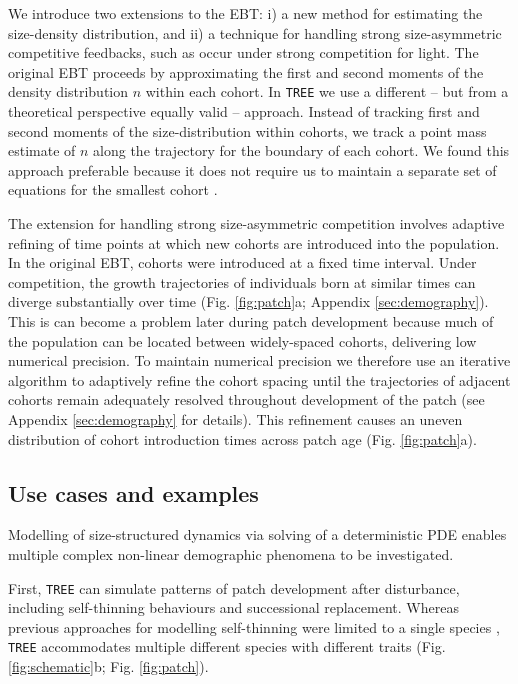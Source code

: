 \documentclass[a4paper,11pt]{article}
\begin{document}
We introduce two extensions to the EBT: i) a new method for estimating
the size-density distribution, and ii) a technique for handling strong
size-asymmetric competitive feedbacks, such as occur under strong
competition for light. The original EBT
\citep{Deroos-1997, Deroos-1992, Deroos-1988} proceeds by approximating
the first and second moments of the density distribution \(n\) within
each cohort. In \texttt{TREE} we use a different -- but from a theoretical
perspective equally valid --  approach. Instead of tracking first and second
moments of the size-distribution within cohorts, we track a point mass
estimate of \(n\) along the trajectory for the boundary
of each cohort. We found this approach preferable because it does not
require us to maintain a separate set of equations for the smallest
cohort \citep{Deroos-1997}.

The extension for handling strong size-asymmetric competition involves
adaptive refining of time points at which new cohorts are introduced
into the population. In the original EBT, cohorts were introduced at a
fixed time interval. Under competition, the growth trajectories of
individuals born at similar times can diverge substantially over time
(Fig. \ref{fig:patch}a; Appendix \ref{sec:demography}).
This is can become a problem later during patch
development because much of the population can be located between
widely-spaced cohorts, delivering low numerical precision. To maintain
numerical precision we therefore use an iterative algorithm to adaptively refine
the cohort spacing until the trajectories of adjacent cohorts remain
adequately resolved throughout development of the patch (see
Appendix \ref{sec:demography} for details). This refinement causes an uneven
distribution of cohort introduction times across patch age (Fig.
\ref{fig:patch}a).

\subsection{Use cases and examples}

Modelling of size-structured dynamics via solving of a deterministic PDE
enables multiple complex non-linear demographic phenomena to be
investigated.

First, \texttt{TREE} can simulate patterns of patch development after
disturbance, including self-thinning behaviours and successional
replacement. Whereas previous approaches for modelling self-thinning
were limited to a single species
\citep[e.g.][]{Barnes-2004, Coomes-2007}, \texttt{TREE} accommodates multiple
different species with different traits (Fig. \ref{fig:schematic}b; Fig.
\ref{fig:patch}).
\end{document}
